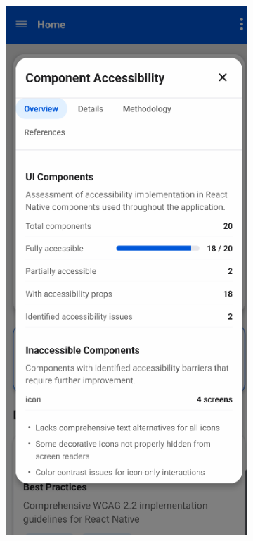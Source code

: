 \pagebreak

\begin{figure}[ht]
    \centering
    \begin{subfigure}[b]{0.48\textwidth}
        \centering
        \includegraphics[width=\linewidth]{img/component-modal.png}

\end{subfigure}
\end{figure}
